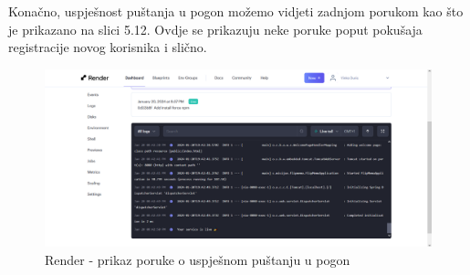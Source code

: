 			Konačno, uspješnost puštanja u pogon možemo vidjeti zadnjom porukom kao što je prikazano na slici 5.12. Ovdje se prikazuju neke poruke poput pokušaja registracije novog korisnika i slično.
			
			\begin{figure}[H]
				\includegraphics[width=\textwidth]{slike/deploy9.PNG}
				\caption{Render - prikaz poruke o uspješnom puštanju u pogon}
				\label{fig:deployment9}
			\end{figure}
			
			
			\eject 